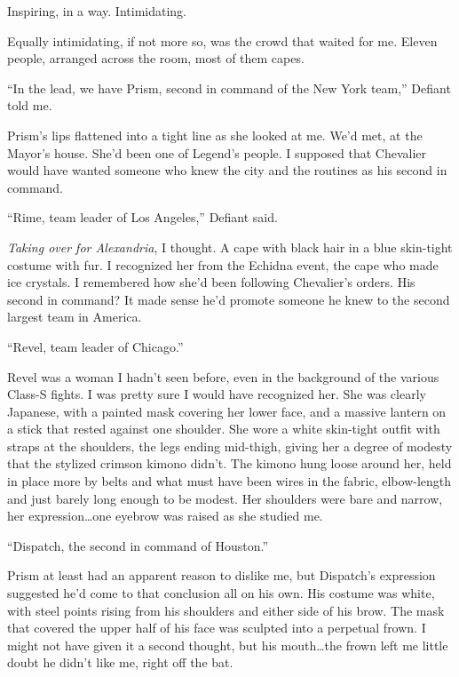 Inspiring, in a way.  Intimidating.



Equally intimidating, if not more so, was the crowd that waited for me.  Eleven people, arranged across the room, most of them capes.



``In the lead, we have Prism, second in command of the New York team,'' Defiant told me.



Prism's lips flattened into a tight line as she looked at me.  We'd met, at the Mayor's house.  She'd been one of Legend's people.  I supposed that Chevalier would have wanted someone who knew the city and the routines as his second in command.



``Rime, team leader of Los Angeles,'' Defiant said.



\emph{Taking over for Alexandria}, I thought.  A cape with black hair in a blue skin-tight costume with fur.  I recognized her from the Echidna event, the cape who made ice crystals.  I remembered how she'd been following Chevalier's orders.  His second in command?  It made sense he'd promote someone he knew to the second largest team in America.



``Revel, team leader of Chicago.''



Revel was a woman I hadn't seen before, even in the background of the various Class-S fights.  I was pretty sure I would have recognized her.  She was clearly Japanese, with a painted mask covering her lower face, and a massive lantern on a stick that rested against one shoulder.  She wore a white skin-tight outfit with straps at the shoulders, the legs ending mid-thigh, giving her a degree of modesty that the stylized crimson kimono didn't.  The kimono hung loose around her, held in place more by belts and what must have been wires in the fabric, elbow-length and just barely long enough to be modest.  Her shoulders were bare and narrow, her expression\ldots one eyebrow was raised as she studied me.



``Dispatch, the second in command of Houston.''



Prism at least had an apparent reason to dislike me, but Dispatch's expression suggested he'd come to that conclusion all on his own.  His costume was white, with steel points rising from his shoulders and either side of his brow.  The mask that covered the upper half of his face was sculpted into a perpetual frown.  I might not have given it a second thought, but his mouth\ldots the frown left me little doubt he didn't like me, right off the bat.



